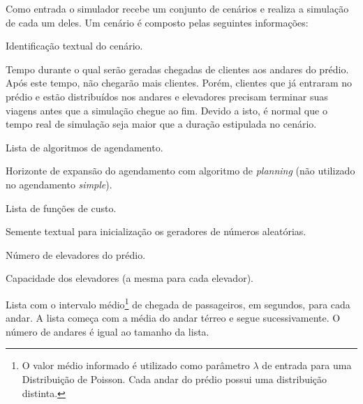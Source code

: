 Como entrada o simulador recebe um conjunto de cenários e realiza a simulação de
cada um deles. Um cenário é composto pelas seguintes informações:

\begin{description}[leftmargin=!,labelwidth=\widthof{\bfseries Função de Custo}]
  \item[Nome]

  Identificação textual do cenário.

  \item[Duração]

  Tempo durante o qual serão geradas chegadas de clientes aos andares do prédio.
  Após este tempo, não chegarão mais clientes. Porém, clientes que já entraram
  no prédio e estão distribuídos nos andares e elevadores precisam terminar suas
  viagens antes que a simulação chegue ao fim. Devido a isto, é normal que o
  tempo real de simulação seja maior que a duração estipulada no cenário.

  \item[Agendamento]

  Lista de algoritmos de agendamento.

  \item[Horizonte]

  Horizonte de expansão do agendamento com algoritmo de \textit{planning} (não utilizado no agendamento \textit{simple}).

  \item[Função de Custo]

  Lista de funções de custo.

  \item[Semente]

  Semente textual para inicialização os geradores de números aleatórias.

  \item[Elevadores]

  Número de elevadores do prédio.

  \item[Capacidade]

  Capacidade dos elevadores (a mesma para cada elevador).

  \item[Andares]

  Lista com o intervalo médio\footnote{O valor médio informado é utilizado como
  parâmetro $\lambda$ de entrada para uma Distribuição de Poisson. Cada andar do
  prédio possui uma distribuição distinta.} de chegada de passageiros, em
  segundos, para cada andar. A lista começa com a média do andar térreo e segue
  sucessivamente. O número de andares é igual ao tamanho da lista.

\end{description}


